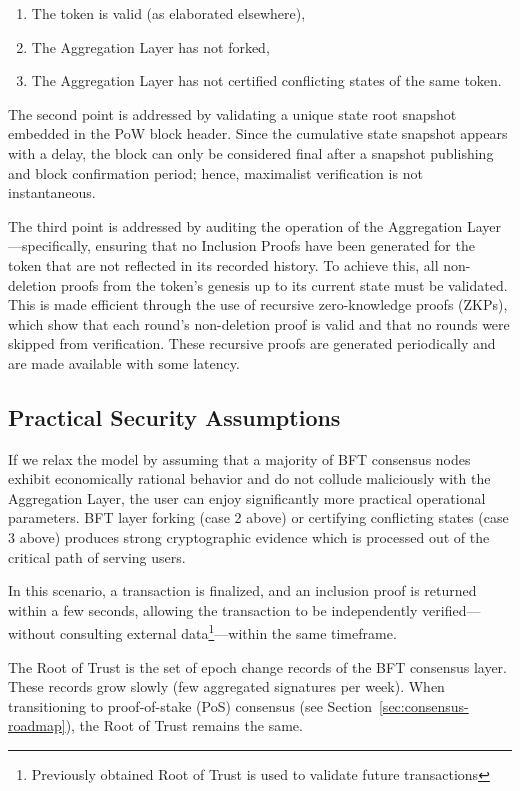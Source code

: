 \documentclass[twocolumn]{article}
\begin{document}
\begin{enumerate}[nosep]
    \item The token is valid (as elaborated elsewhere),
    \item The Aggregation Layer has not forked,
    \item The Aggregation Layer has not certified conflicting states of the same token.
\end{enumerate}

The second point is addressed by validating a unique state root snapshot embedded in the PoW block header. Since the cumulative state snapshot appears with a delay, the block can only be considered final after a snapshot publishing and block confirmation period; hence, maximalist verification is not instantaneous.

The third point is addressed by auditing the operation of the Aggregation Layer—specifically, ensuring that no Inclusion Proofs have been generated for the token that are not reflected in its recorded history. To achieve this, all non-deletion proofs from the token's genesis up to its current state must be validated. This is made efficient through the use of recursive zero-knowledge proofs (ZKPs), which show that each round’s non-deletion proof is valid and that no rounds were skipped from verification. These recursive proofs are generated periodically and are made available with some latency.

\subsection{Practical Security Assumptions}

If we relax the model by assuming that a majority of BFT consensus nodes exhibit economically rational behavior and do not collude maliciously with the Aggregation Layer, the user can enjoy significantly more practical operational parameters. BFT layer forking (case 2 above) or certifying conflicting states (case 3 above) produces strong cryptographic evidence which is processed out of the critical path of serving users.

In this scenario, a transaction is finalized, and an inclusion proof is returned within a few seconds, allowing the transaction to be independently verified—without consulting external data\footnote{Previously obtained Root of Trust is used to validate future transactions}—within the same timeframe.

The Root of Trust is the set of epoch change records of the BFT consensus layer. These records grow slowly (few aggregated signatures per week). When transitioning to proof-of-stake (PoS) consensus (see Section~\ref{sec:consensus-roadmap}), the Root of Trust remains the same.
\end{document}
